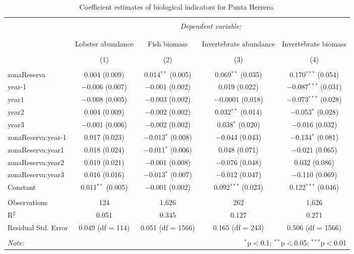 \documentclass[utf8]{frontiers_suppmat} %
\theoremstyle{definition}
\theoremstyle{definition}
\theoremstyle{definition}
\theoremstyle{remark}
\begin{document}
\begin{table}[!htbp] \centering 
  \caption{Coefficient estimates of biological indicators for Punta Herrero.} 
  \label{} 
\small 
\begin{tabular}{@{\extracolsep{1pt}}lcccc} 
\\[-1.8ex]\hline 
\hline \\[-1.8ex] 
 & \multicolumn{4}{c}{\textit{Dependent variable:}} \\ 
\cline{2-5} 
\\[-1.8ex] & \multicolumn{4}{c}{} \\ 
 & Lobster abundance & Fish biomass & Invertebrate abundance & Invertebrate biomass \\ 
\\[-1.8ex] & (1) & (2) & (3) & (4)\\ 
\hline \\[-1.8ex] 
 zonaReserva & 0.004 (0.009) & 0.014$^{**}$ (0.005) & 0.069$^{**}$ (0.035) & 0.170$^{***}$ (0.054) \\ 
  year-1 & $-$0.006 (0.007) & $-$0.001 (0.002) & 0.019 (0.022) & $-$0.087$^{***}$ (0.031) \\ 
  year1 & $-$0.008 (0.005) & $-$0.003 (0.002) & $-$0.0001 (0.018) & $-$0.073$^{***}$ (0.028) \\ 
  year2 & 0.004 (0.009) & $-$0.002 (0.002) & 0.032$^{**}$ (0.014) & $-$0.053$^{*}$ (0.028) \\ 
  year3 & $-$0.001 (0.006) & $-$0.002 (0.002) & 0.038$^{*}$ (0.020) & $-$0.016 (0.032) \\ 
  zonaReserva:year-1 & 0.017 (0.023) & $-$0.013$^{*}$ (0.008) & $-$0.044 (0.043) & $-$0.134$^{*}$ (0.081) \\ 
  zonaReserva:year1 & 0.018 (0.024) & $-$0.011$^{*}$ (0.006) & 0.048 (0.071) & $-$0.021 (0.065) \\ 
  zonaReserva:year2 & 0.019 (0.021) & $-$0.001 (0.008) & $-$0.076 (0.048) & 0.032 (0.086) \\ 
  zonaReserva:year3 & 0.016 (0.016) & $-$0.013$^{*}$ (0.007) & $-$0.012 (0.047) & $-$0.110 (0.069) \\ 
  Constant & 0.011$^{**}$ (0.005) & $-$0.001 (0.002) & 0.092$^{***}$ (0.023) & 0.122$^{***}$ (0.046) \\ 
 \hline \\[-1.8ex] 
Observations & 124 & 1,626 & 262 & 1,626 \\ 
R$^{2}$ & 0.051 & 0.345 & 0.127 & 0.271 \\ 
Residual Std. Error & 0.049 (df = 114) & 0.051 (df = 1566) & 0.165 (df = 243) & 0.506 (df = 1566) \\ 
\hline 
\hline \\[-1.8ex] 
\textit{Note:}  & \multicolumn{4}{r}{$^{*}$p$<$0.1; $^{**}$p$<$0.05; $^{***}$p$<$0.01} \\ 
\end{tabular} 
\end{table}
\end{document}
